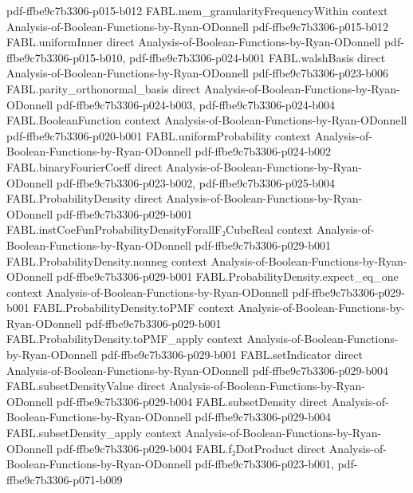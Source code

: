 \begin{theorem}
{    pdf-ffbe9c7b3306-p015-b012}
\proofstep
  {FABL.mem_granularityFrequencyWithin}
  {context}
  {Analysis-of-Boolean-Functions-by-Ryan-ODonnell}
  {pdf-ffbe9c7b3306-p015-b012}
\proofstep
  {FABL.uniformInner}
  {direct}
  {Analysis-of-Boolean-Functions-by-Ryan-ODonnell}
  {pdf-ffbe9c7b3306-p015-b010,
    pdf-ffbe9c7b3306-p024-b001}
\proofstep
  {FABL.walshBasis}
  {direct}
  {Analysis-of-Boolean-Functions-by-Ryan-ODonnell}
  {pdf-ffbe9c7b3306-p023-b006}
\proofstep
  {FABL.parity_orthonormal_basis}
  {direct}
  {Analysis-of-Boolean-Functions-by-Ryan-ODonnell}
  {pdf-ffbe9c7b3306-p024-b003,
    pdf-ffbe9c7b3306-p024-b004}
\proofstep
  {FABL.BooleanFunction}
  {context}
  {Analysis-of-Boolean-Functions-by-Ryan-ODonnell}
  {pdf-ffbe9c7b3306-p020-b001}
\proofstep
  {FABL.uniformProbability}
  {context}
  {Analysis-of-Boolean-Functions-by-Ryan-ODonnell}
  {pdf-ffbe9c7b3306-p024-b002}
\proofstep
  {FABL.binaryFourierCoeff}
  {direct}
  {Analysis-of-Boolean-Functions-by-Ryan-ODonnell}
  {pdf-ffbe9c7b3306-p023-b002,
    pdf-ffbe9c7b3306-p025-b004}
\proofstep
  {FABL.ProbabilityDensity}
  {direct}
  {Analysis-of-Boolean-Functions-by-Ryan-ODonnell}
  {pdf-ffbe9c7b3306-p029-b001}
\proofstep
  {FABL.instCoeFunProbabilityDensityForallF₂CubeReal}
  {context}
  {Analysis-of-Boolean-Functions-by-Ryan-ODonnell}
  {pdf-ffbe9c7b3306-p029-b001}
\proofstep
  {FABL.ProbabilityDensity.nonneg}
  {context}
  {Analysis-of-Boolean-Functions-by-Ryan-ODonnell}
  {pdf-ffbe9c7b3306-p029-b001}
\proofstep
  {FABL.ProbabilityDensity.expect_eq_one}
  {context}
  {Analysis-of-Boolean-Functions-by-Ryan-ODonnell}
  {pdf-ffbe9c7b3306-p029-b001}
\proofstep
  {FABL.ProbabilityDensity.toPMF}
  {context}
  {Analysis-of-Boolean-Functions-by-Ryan-ODonnell}
  {pdf-ffbe9c7b3306-p029-b001}
\proofstep
  {FABL.ProbabilityDensity.toPMF_apply}
  {context}
  {Analysis-of-Boolean-Functions-by-Ryan-ODonnell}
  {pdf-ffbe9c7b3306-p029-b001}
\proofstep
  {FABL.setIndicator}
  {direct}
  {Analysis-of-Boolean-Functions-by-Ryan-ODonnell}
  {pdf-ffbe9c7b3306-p029-b004}
\proofstep
  {FABL.subsetDensityValue}
  {direct}
  {Analysis-of-Boolean-Functions-by-Ryan-ODonnell}
  {pdf-ffbe9c7b3306-p029-b004}
\proofstep
  {FABL.subsetDensity}
  {direct}
  {Analysis-of-Boolean-Functions-by-Ryan-ODonnell}
  {pdf-ffbe9c7b3306-p029-b004}
\proofstep
  {FABL.subsetDensity_apply}
  {context}
  {Analysis-of-Boolean-Functions-by-Ryan-ODonnell}
  {pdf-ffbe9c7b3306-p029-b004}
\proofstep
  {FABL.f₂DotProduct}
  {direct}
  {Analysis-of-Boolean-Functions-by-Ryan-ODonnell}
  {pdf-ffbe9c7b3306-p023-b001,
    pdf-ffbe9c7b3306-p071-b009}
\proofstep

\end{theorem}
